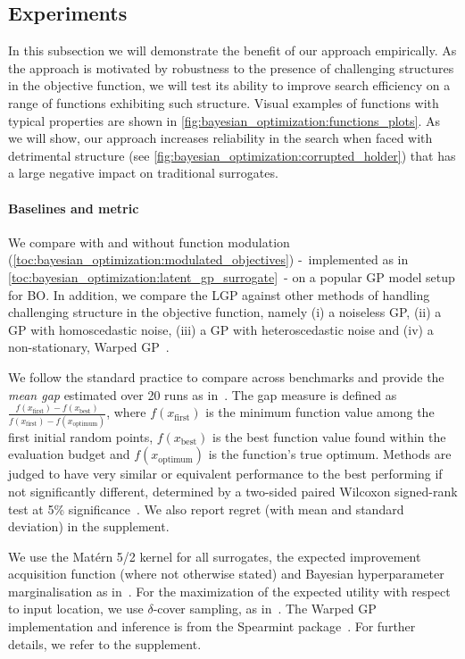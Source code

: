 \subsection{Experiments}

In this subsection we will demonstrate the benefit of our approach empirically.
As the approach is motivated by robustness to the presence of challenging structures in the objective function,
we will test its ability to improve search efficiency on a range of functions exhibiting such structure.
Visual examples of functions with typical properties are shown in \cref{fig:bayesian_optimization:functions_plots}.
As we will show,
our approach increases reliability in the search when faced with detrimental structure (see \cref{fig:bayesian_optimization:corrupted_holder})
that has a large negative impact on traditional surrogates.

\paragraph{Baselines and metric}
We compare with and without function modulation (\cref{toc:bayesian_optimization:modulated_objectives})
-~implemented as in \cref{toc:bayesian_optimization:latent_gp_surrogate}~-
on a popular GP model setup for BO.
In addition, we compare the LGP against other methods of handling challenging structure in the objective function,
namely (i) a noiseless GP,
(ii) a GP with homoscedastic noise,
(iii) a GP with heteroscedastic noise and
(iv) a non-stationary,
Warped GP~\parencite{snoek_input_2014}.

We follow the standard practice to compare across benchmarks and provide the \emph{mean gap} estimated over 20 runs as in~\parencite{malkomes_automating_2018}.
The gap measure is defined as $\frac{f(x_{\text{first}}) - f(x_{\text{best}})}{f(x_{\text{first}}) - f(x_{\text{optimum}})}$,
where $f(x_{\text{first}})$ is the minimum function value among the first initial random points,
$f(x_{\text{best}})$ is the best function value found within the evaluation budget and $f(x_{\text{optimum}})$ is the function's true optimum.
Methods are judged to have very similar or equivalent performance to the best performing if not significantly different,
determined by a two-sided paired Wilcoxon signed-rank test at 5\% significance~\parencite{malkomes_automating_2018}.
We also report regret (with mean and standard deviation) in the supplement.

We use the Mat\'{e}rn 5/2 kernel for all surrogates, the expected improvement acquisition function (where not otherwise stated) and Bayesian hyperparameter marginalisation as in~\parencite{snoek_practical_2012}.
For the maximization of the expected utility with respect to input location,
we use $\delta$-cover sampling, as in~\parencite{de_freitas_exponential_2012}.
The Warped GP implementation and inference is from the Spearmint package~\parencite{snoek_input_2014}.
For further details, we refer to the supplement.

